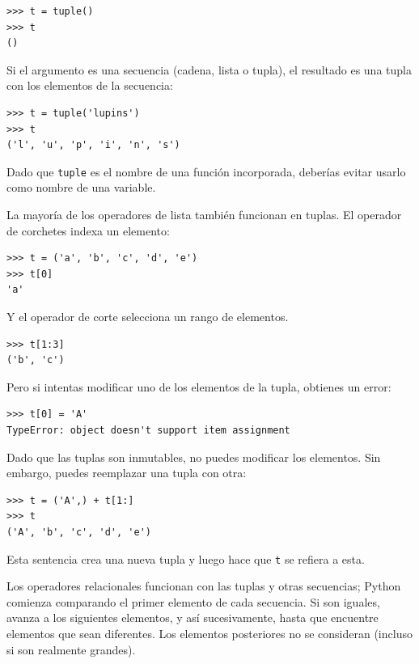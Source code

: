 \documentclass[10pt]{book}
\begin{document}
\begin{verbatim}
>>> t = tuple()
>>> t
()
\end{verbatim}
%
Si el argumento es una secuencia (cadena, lista o tupla), el resultado
es una tupla con los elementos de la secuencia:

\begin{verbatim}
>>> t = tuple('lupins')
>>> t
('l', 'u', 'p', 'i', 'n', 's')
\end{verbatim}
%
Dado que {\tt tuple} es el nombre de una función incorporada, deberías
evitar usarlo como nombre de una variable.

La mayoría de los operadores de lista también funcionan en tuplas.  El operador de corchetes
indexa un elemento:

\begin{verbatim}
>>> t = ('a', 'b', 'c', 'd', 'e')
>>> t[0]
'a'
\end{verbatim}
%
Y el operador de corte selecciona un rango de elementos.

\begin{verbatim}
>>> t[1:3]
('b', 'c')
\end{verbatim}
%
Pero si intentas modificar uno de los elementos de la tupla, obtienes
un error:

\begin{verbatim}
>>> t[0] = 'A'
TypeError: object doesn't support item assignment
\end{verbatim}
%
Dado que las tuplas son inmutables, no puedes modificar los elementos.  Sin embargo,
puedes reemplazar una tupla con otra:

\begin{verbatim}
>>> t = ('A',) + t[1:]
>>> t
('A', 'b', 'c', 'd', 'e')
\end{verbatim}
%
Esta sentencia crea una nueva tupla y luego hace que {\tt t} se refiera a esta.

Los operadores relacionales funcionan con las tuplas y otras secuencias;
Python comienza comparando el primer elemento de cada
secuencia.  Si son iguales, avanza a los siguientes elementos,
y así sucesivamente, hasta que encuentre elementos que sean diferentes.  Los elementos
posteriores no se consideran (incluso si son realmente grandes).
\end{document}
